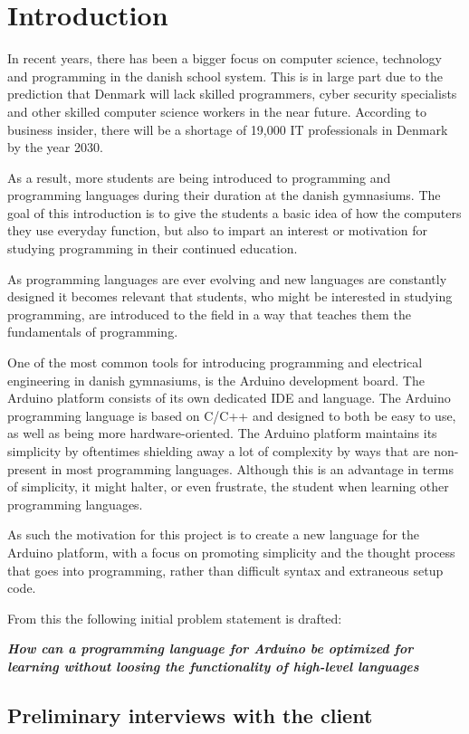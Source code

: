 
\chapter{Introduction}
In recent years, there has been a bigger focus on computer science, technology and programming in the danish school system.
This is in large part due to the prediction that Denmark will lack skilled programmers, cyber security specialists and other skilled computer science workers in the near future.
According to business insider, there will be a shortage of 19,000 IT professionals in Denmark by the year 2030.\cite{ITLackDK}

As a result, more students are being introduced to programming and programming languages during their duration at the
danish gymnasiums. 
The goal of this introduction is to give the students a basic idea of how the computers they use everyday function, but also to impart an interest or motivation for studying programming in their continued education.

As programming languages are ever evolving and new languages are constantly designed it becomes relevant
that students, who might be interested in studying programming, are introduced to the field in a way that
teaches them the fundamentals of programming.

One of the most common tools for introducing programming and electrical engineering in danish gymnasiums, is the Arduino development board. 
The Arduino platform consists of its own dedicated IDE and language.
The Arduino programming language is based on C/C++ and designed to both be easy to use, as well as being
more hardware-oriented.\cite{ArFAQ}
The Arduino platform maintains its simplicity by oftentimes shielding away a lot of complexity by ways
that are non-present in most programming languages.
Although this is an advantage in terms of simplicity, it might halter, or even frustrate, the student when learning other programming languages.

As such the motivation for this project is to create a new language for the Arduino platform, with a focus on promoting simplicity and the thought process that goes into programming, rather than difficult syntax and extraneous setup code.


From this the following initial problem statement is drafted:

\begin{center}
	\textit{\textbf{How can a programming language for Arduino be optimized for learning without 
			loosing the functionality of high-level languages}}
\end{center}

\section{Preliminary interviews with the client}
